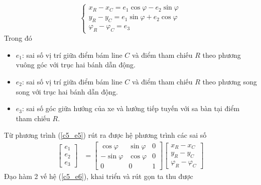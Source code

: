           \begin{equation}
               \begin{cases}
                    x_R - x_C = e_1 \cos \varphi - e_2 \sin \varphi \\[0.5em]
                    y_R - y_C = e_1 \sin \varphi + e_2 \cos \varphi \\[0.5em]
                    \varphi_R - \varphi_C = e_3
               \end{cases}    
               \label{c5_e5}           
          \end{equation}
          \hspace*{0.6cm}Trong đó
          \begin{itemize}
               \item $e_1$: sai số vị trí giữa điểm bám line $C$ và điểm tham chiếu $R$ theo phương vuông góc với trục hai bánh dẫn động.
               \item $e_2$: sai số vị trí giữa điểm bám line $C$ và điểm tham chiếu $R$ theo phương song song với trục hai bánh dẫn động.
               \item $e_3$: sai số góc giữa hướng của xe và hướng tiếp tuyến với sa bàn tại điểm tham chiếu $R$.
          \end{itemize}    
          \hspace*{0.6cm}Từ phương trình (\ref{c5_e5}) rút ra được hệ phương trình các sai số
          \begin{align}
               \begin{bmatrix}
                    e_1 \\
                    e_2 \\
                    e_3
                    \end{bmatrix} &= \begin{bmatrix}
                    \cos\varphi & \sin \varphi & 0 \\
                    -\sin\varphi & \cos \varphi & 0 \\
                    0 & 0 & 1
                    \end{bmatrix} \begin{bmatrix}
                    x_R - x_C \\
                    y_R - y_C \\
                    \varphi_R - \varphi_C
               \end{bmatrix}
               \label{c5_e6}
          \end{align}
          \hspace*{0.6cm}Đạo hàm 2 vế hệ (\ref{c5_e6}), khai triển và rút gọn ta thu được 
